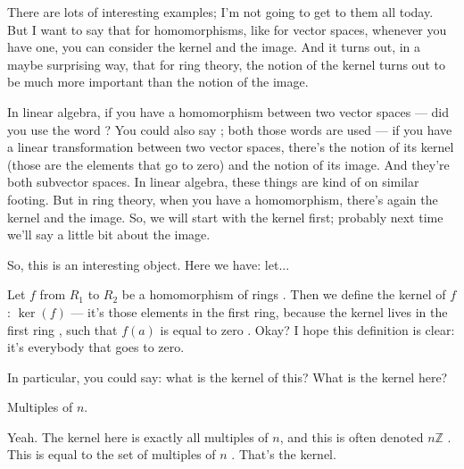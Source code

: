\begin{speech}[00:30:49 - 00:32:06]
There are lots of interesting examples; I'm not going to get to them all today. But I want to say that  for homomorphisms, like for vector spaces, whenever you have one, you can consider the kernel and the image.  And it turns out, in a maybe surprising way, that for ring theory, the notion of the kernel turns out to be much more important than the notion of the image.

In linear algebra, if you have a homomorphism between two vector spaces --- did you use the word ? You could also say ; both those words are used --- if you have a linear transformation between two vector spaces, there's the notion of its kernel (those are the elements that go to zero) and the notion of its image. And they're both subvector spaces. In linear algebra, these things are kind of on similar footing. But in ring theory, when you have a homomorphism, there's again the kernel and the image. So, we will start with the kernel first; probably next time we'll say a little bit about the image.

So, this is an interesting object. Here we have: let...
\end{speech}

\begin{speech}[00:32:06 - 00:32:56]
Let $f$ from $R_1$ to $R_2$  be a homomorphism of rings . Then we define the kernel of $f$: $\ker(f)$  --- it's those elements in the first ring, because the kernel lives in the first ring , such that $f(a)$ is equal to zero . Okay? I hope this definition is clear: it's everybody that goes to zero.

In particular, you could say: what is the kernel of this?  What is the kernel here?
\end{speech}

\begin{student}
Multiples of $n$.
\end{student}

\begin{speech}[00:32:57 - 00:33:17]
Yeah. The kernel here is exactly all multiples of $n$, and this is often denoted $n\mathbb{Z}$ . This is equal to the set of multiples of $n$ . That's the kernel.
\end{speech}

